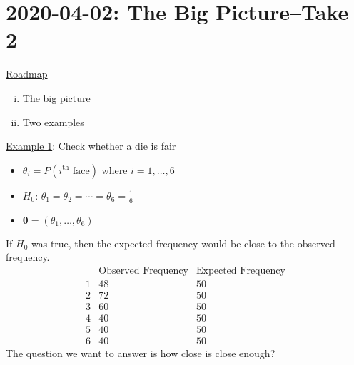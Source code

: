 \section{2020-04-02: The Big Picture--Take 2}
\underline{Roadmap}
\begin{enumerate}[(i)]
    \item The big picture
    \item Two examples
\end{enumerate}
\underline{Example 1}: Check whether a die is fair
\begin{itemize}
    \item $ \theta_i=P(i^{\text{th}} \text{ face}) $ where $ i=1,\ldots ,6 $
    \item $ H_0 $: $ \theta_1=\theta_2=\cdots=\theta_6=\frac{1}{6} $
    \item $ \bm{\theta}=(\theta_1,\ldots ,\theta_6) $
\end{itemize}
If $ H_0 $ was true, then the expected frequency would be close
to the observed frequency.
\[
    \begin{array}{c|c|c|}
          & \text{Observed Frequency} & \text{Expected Frequency} \\
        \hline
        1 & 48                        & 50                        \\
        2 & 72                        & 50                        \\
        3 & 60                        & 50                        \\
        4 & 40                        & 50                        \\
        5 & 40                        & 50                        \\
        6 & 40                        & 50
    \end{array}
\]
The question we want to answer is how close is close enough?


